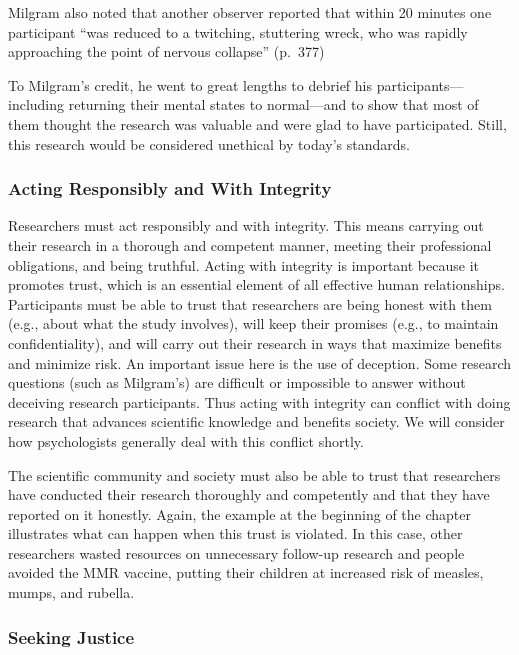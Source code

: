 \documentclass[
]{krantz}
\begin{document}
Milgram also noted that another observer reported that within 20 minutes one participant ``was reduced to a twitching, stuttering wreck, who was rapidly approaching the point of nervous collapse'' (p.~377)

To Milgram's credit, he went to great lengths to debrief his participants---including returning their mental states to normal---and to show that most of them thought the research was valuable and were glad to have participated. Still, this research would be considered unethical by today's standards.

\subsubsection*{Acting Responsibly and With Integrity}\label{acting-responsibly-and-with-integrity}


Researchers must act responsibly and with integrity. This means carrying out their research in a thorough and competent manner, meeting their professional obligations, and being truthful. Acting with integrity is important because it promotes trust, which is an essential element of all effective human relationships. Participants must be able to trust that researchers are being honest with them (e.g., about what the study involves), will keep their promises (e.g., to maintain confidentiality), and will carry out their research in ways that maximize benefits and minimize risk. An important issue here is the use of deception. Some research questions (such as Milgram's) are difficult or impossible to answer without deceiving research participants. Thus acting with integrity can conflict with doing research that advances scientific knowledge and benefits society. We will consider how psychologists generally deal with this conflict shortly.

The scientific community and society must also be able to trust that researchers have conducted their research thoroughly and competently and that they have reported on it honestly. Again, the example at the beginning of the chapter illustrates what can happen when this trust is violated. In this case, other researchers wasted resources on unnecessary follow-up research and people avoided the MMR vaccine, putting their children at increased risk of measles, mumps, and rubella.

\subsubsection*{Seeking Justice}\label{seeking-justice}
\end{document}
